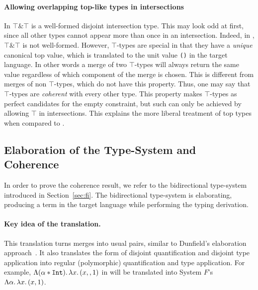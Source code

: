 \paragraph{Allowing overlapping top-like types in intersections} 
In \name $\top \& \top$ is a well-formed disjoint intersection type.
This may look odd at first, since all other types
cannot appear more than once in an intersection. Indeed, in \oldname, 
$\top \& \top$ is not well-formed. However, $\top$-types are special 
in that they have a \emph{unique} canonical top value, which is
translated to the unit value \lstinline{()} in the target language. In
other words a merge of two $\top$-types will always return the same value 
regardless of which component of the merge is chosen. 
This is different 
from merges of non $\top$-types, which do not have this
property.  
Thus, one may say that $\top$-types are \emph{coherent} with every other type.
This property makes $\top$-types as perfect candidates for the empty constraint,
but such can only be achieved by allowing $\top$ in intersections.
This explains the more liberal treatment of top types \name when
compared to \oldname.

\subsection{Elaboration of the Type-System and Coherence} 
In order to prove the coherence result, we refer to the bidirectional type-system introduced in
Section~\ref{sec:fi}. 
The bidirectional type-system is elaborating, producing a term in the target language while
performing the typing derivation.

\paragraph{Key idea of the translation.}
This translation turns merges into usual pairs, similar to Dunfield's
elaboration approach~\cite{dunfield2014elaborating}.
It also translates the form of disjoint quantification and disjoint type application into regular (polymorphic) 
quantification and type application. 
For example, $\Lambda (\alpha*\texttt{Int}).\, \lambda x.\, (x ,, 1)$ in \name will be translated into System $F$'s 
$\Lambda \alpha.\, \lambda x.\, (x, 1)$.
\begin{comment}
This is achieved by means of the type-directed translation.
Note that, when performing type application, the type-system will ensure that the type being applied is compatible
with the disjoint constraint, otherwise the program is rejected.
For example, applying the term above to $\tychar$ would be accepted, and the generated term would translate this
into System $F$'s type application.
On the other hand, applying the term to $\tyint$ would be rejected, and hence the target term produced is meaningless.
\end{comment}

